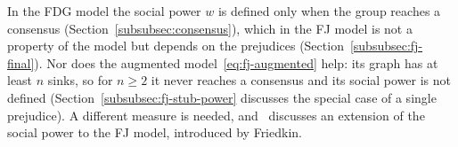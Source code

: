 In the FDG model the social power $w$ is defined only when the group reaches a
consensus (Section~\ref{subsubsec:consensus}), which in the FJ model is not a property of
the model but depends on the prejudices (Section~\ref{subsubsec:fj-final}).
 Nor does the augmented
model~\eqref{eq:fj-augmented} help:
 its graph has at least $n$ sinks, so for $n \geq 2$
it never reaches a consensus and its social power is not defined
(Section~\ref{subsubsec:fj-stub-power} discusses the special case of a single
prejudice). A different measure is needed,
and~\cite{proskurnikov2017tutorial} discusses an extension of the social power to the FJ
model, introduced by Friedkin.

